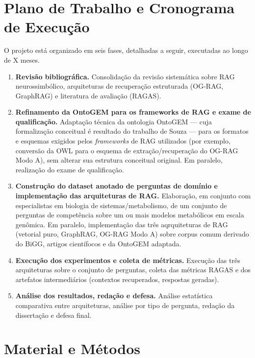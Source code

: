 \documentclass{article}
\begin{document}
\section{Plano de Trabalho e Cronograma de Execução}

O projeto está organizado em seis fases, detalhadas a seguir, executadas ao longo de X meses.

\begin{enumerate}
	\item \textbf{Revisão bibliográfica.} Consolidação da revisão sistemática sobre RAG neurossimbólico, arquiteturas de recuperação estruturada (OG-RAG, GraphRAG) e literatura de avaliação (RAGAS).
	\item \textbf{Refinamento da OntoGEM para os frameworks de RAG e exame de qualificação.} Adaptação técnica da ontologia OntoGEM \cite{souza2025ontogem} --- cuja formalização conceitual é resultado do trabalho de Souza \cite{souza2025ontogem} --- para os formatos e esquemas exigidos pelos \textit{frameworks} de RAG utilizados (por exemplo, conversão da OWL para o esquema de extração/recuperação do OG-RAG Modo A), sem alterar sua estrutura conceitual original. Em paralelo, realização do exame de qualificação.
	\item \textbf{Construção do dataset anotado de perguntas de domínio e implementação das arquiteturas de RAG.} Elaboração, em conjunto com especialistas em biologia de sistemas/metabolismo, de um conjunto de perguntas de competência sobre um ou mais modelos metabólicos em escala genômica. Em paralelo, implementação das três aqrquiteturas de RAG (vetorial puro, GraphRAG, OG-RAG Modo A) sobre corpus comum derivado do BiGG, artigos científocos e da OntoGEM adaptada.
	\item \textbf{Execução dos experimentos e coleta de métricas.} Execução das três arquiteturas sobre o conjunto de perguntas, coleta das métricas RAGAS e dos artefatos intermediários (contextos recuperados, respostas geradas).
	\item \textbf{Análise dos resultados, redação e defesa.} Análise estatística comparativa entre arquiteturas, análise por tipo de pergunta, redação da dissertação e defesa final.
\end{enumerate}

\section{Material e Métodos}
\end{document}

